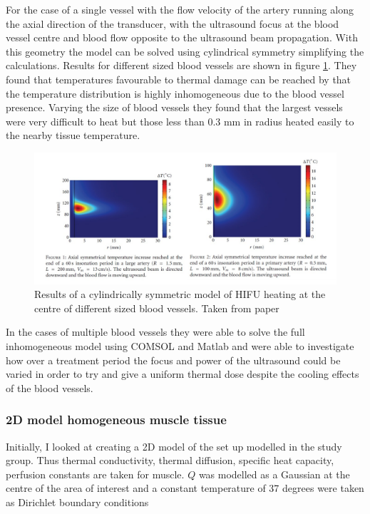 \documentclass[11pt]{article} %
\begin{document}
\begin{itemize}
	For the case of a single vessel  with the flow velocity of the artery running along the axial direction of the transducer, with the ultrasound focus at the blood vessel centre and blood flow opposite to the ultrasound beam propagation. With this geometry the model can be solved using cylindrical symmetry simplifying the calculations.  Results for different sized blood vessels are shown in figure \ref{fig:sassaroli}. They found that temperatures favourable to thermal damage can be reached by that the temperature distribution is highly inhomogeneous due to the blood vessel presence.  Varying the size of blood vessels they found that the largest vessels were very difficult to heat but those less than 0.3 mm in radius heated easily to the nearby tissue temperature.
	\begin{figure}
		\centering
		\includegraphics[width=\linewidth]{Report_images/sassaroli}
		\caption{Results of a cylindrically symmetric model of HIFU heating at the centre of different sized blood vessels. Taken from paper \cite{Sassaroli2012}}
		\label{fig:sassaroli}
	\end{figure}
	
	In the cases of multiple blood vessels they were able to solve the full inhomogeneous model using COMSOL and Matlab and were able to investigate how over a treatment period the focus and power of the ultrasound could be varied in order to try and give a uniform thermal dose despite the cooling effects of the blood vessels.   
\end{itemize}





 
 \subsubsection{2D model homogeneous muscle tissue}
Initially, I looked at creating a 2D model of the set up modelled in the study group. Thus thermal conductivity, thermal diffusion, specific heat capacity, perfusion constants are taken for muscle.
$ Q $ was modelled as a Gaussian at the centre of the area of interest and a constant temperature of 37 degrees  were taken as Dirichlet boundary conditions 
\end{document}
